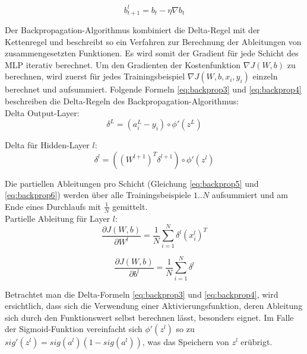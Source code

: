 \begin{equation} 
\label{eq:backprop2}
b_{t+1}^l = b_t - \eta {\nabla b_t} %
\end{equation}

Der Backpropagation-Algorithmus kombiniert die Delta-Regel mit der Kettenregel und beschreibt so ein Verfahren zur Berechnung der Ableitungen von zusammengesetzten Funktionen. Es wird somit der Gradient für jede Schicht des MLP iterativ berechnet. Um den Gradienten der Kostenfunktion $\nabla J(W,b)$ zu berechnen, wird zuerst für jedes Trainingsbeispiel $\nabla J(W,b,x_i,y_i)$ einzeln berechnet und aufsummiert. Folgende Formeln \ref{eq:backprop3} und \ref{eq:backprop4} beschreiben die Delta-Regeln des Backpropagation-Algorithmus: \\

Delta Output-Layer:
\begin{equation} 
\label{eq:backprop3}
\delta^{L} = (a_i^{L} - y_i) \circ \phi'(z^{L})
\end{equation}

Delta für Hidden-Layer $l$:
\begin{equation} 
\label{eq:backprop4}
\delta^{l} =  ((W^{l+1})^T\delta^{l+1}) \circ \phi'(z^l)
\end{equation}

Die partiellen Ableitungen pro Schicht (Gleichung \ref{eq:backprop5} und \ref{eq:backprop6}) werden über alle Trainingsbeispiele $1..N$ aufsummiert und am Ende eines Durchlaufs mit $\frac{1}{N}$ gemittelt. \\

Partielle Ableitung für Layer $l$:
\begin{equation} 
\label{eq:backprop5}
\frac{\partial J(W,b)}{\partial W^l} = \frac{1}{N} \sum_{i=1}^{N} \delta^{l} (x_i^{l})^T
\end{equation}

\begin{equation} 
\label{eq:backprop6}
\frac{\partial J(W,b)}{\partial b^l} = \frac{1}{N} \sum_{i=1}^{N} \delta^{l}
\end{equation}

Betrachtet man die Delta-Formeln \ref{eq:backprop3} und \ref{eq:backprop4}, wird ersichtlich, dass sich die Verwendung einer Aktivierungsfunktion, deren Ableitung sich durch den Funktionswert selbst berechnen lässt, besonders eignet. Im Falle der Sigmoid-Funktion vereinfacht sich $\phi'(z^l)$ so zu $sig'(z^l) = sig(a^l)(1-sig(a^l))$, was das Speichern von $z^l$ erübrigt.


